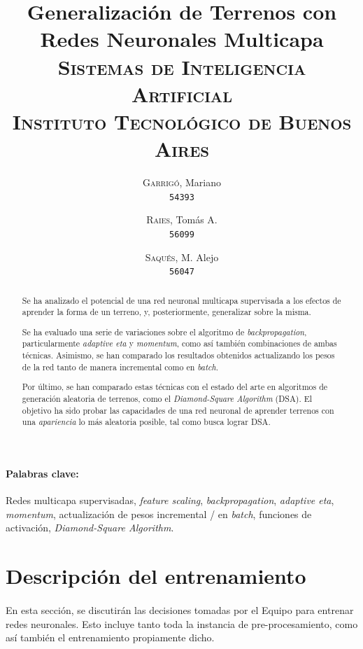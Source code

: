\documentclass[12pt, twocolumn]{article}
\begin{document}
	\title{Generalización de Terrenos con Redes Neuronales Multicapa \\ 
		   \large{\textsc{Sistemas de Inteligencia Artificial}} \\
		   \normalsize{\textsc{Instituto Tecnológico de Buenos Aires}}}
	\author{
		\textsc{Garrigó}, Mariano \\
		\texttt{54393}
		\and
		\textsc{Raies}, Tomás A. \\
		\texttt{56099}
		\and
		\textsc{Saqués}, M. Alejo \\
		\texttt{56047} 
	}
	\date{}
	\maketitle
	
	\begin{abstract}
		Se ha analizado el potencial de una red neuronal multicapa supervisada a los efectos de aprender la forma de un terreno, y, posteriormente, generalizar sobre la misma.
		
		Se ha evaluado una serie de variaciones sobre el algoritmo de \textit{backpropagation}, particularmente \textit{adaptive eta} y \textit{momentum}, como así también combinaciones de ambas técnicas. Asimismo, se han comparado los resultados obtenidos actualizando los pesos de la red tanto de manera incremental como en \textit{batch}. 
		
		Por último, se han comparado estas técnicas con el estado del arte en algoritmos de generación aleatoria de terrenos, como el \textit{Diamond-Square Algorithm} (DSA). El objetivo ha sido probar las capacidades de una red neuronal de aprender terrenos con una \textit{apariencia} lo más aleatoria posible, tal como busca lograr DSA. 
	\end{abstract}
	
	\paragraph{Palabras clave:} Redes multicapa supervisadas, \textit{feature scaling}, \textit{backpropagation}, \textit{adaptive eta}, \textit{momentum}, actualización de pesos incremental / en \textit{batch}, funciones de activación, \textit{Diamond-Square Algorithm}.
	
	\section{Descripción del entrenamiento}
	
	\paragraph{} En esta sección, se discutirán las decisiones tomadas por el Equipo para entrenar redes neuronales. Esto incluye tanto toda la instancia de pre-procesamiento, como así también el entrenamiento propiamente dicho. 
	
\end{document}
